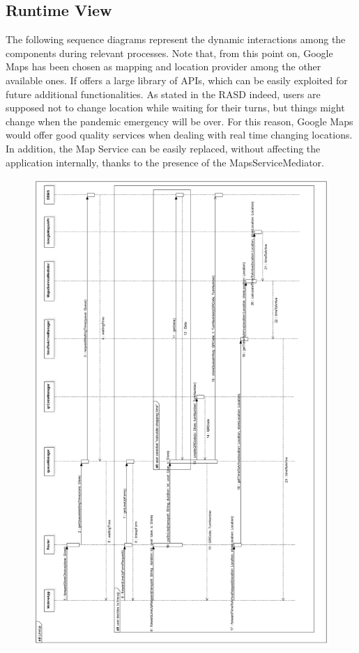 \documentclass{article}
\begin{document}
\subsection{Runtime View}
The following sequence diagrams represent the dynamic interactions among the components during relevant processes.
Note that, from this point on, Google Maps has been chosen as mapping and location provider among the other available ones. If offers a large library of APIs, which can be easily exploited for future additional functionalities. As stated in the RASD indeed, users are supposed not to change location while waiting for their turns, but things might change when the pandemic emergency will be over. For this reason, Google Maps would offer good quality services when dealing with real time changing locations. In addition, the Map Service can be easily replaced, without affecting the application internally, thanks to the presence of the MapsServiceMediator.
\begin{figure}[H]
  \includegraphics[width=\linewidth]{LineUpRT.png}
  
\end{figure}
\end{document}
